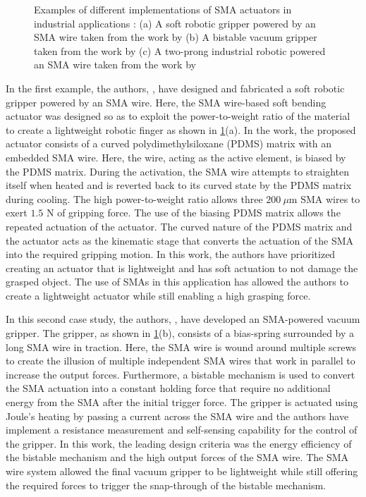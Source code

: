 \begin{figure}[h]
    \centering
    
    \caption{Examples of different implementations of SMA actuators in industrial applications : (a) A soft robotic gripper powered by an SMA wire taken from the work by \cite{rodrigueCurvedShapeMemory2017a} (b) A bistable vacuum gripper taken from the work by \cite{motzkiEnergyefficientSMAVacuum2016} (c) A two-prong industrial robotic powered an SMA wire taken from the work by \cite{luNovelDesignParallel2019}}
    \label{fig:industrial-examples}
\end{figure}

In the first example, the authors, \cite{rodrigueCurvedShapeMemory2017a}, have designed and fabricated a soft robotic gripper powered by an SMA wire. Here, the SMA wire-based soft bending actuator was designed so as to exploit the power-to-weight ratio of the material to create a lightweight robotic finger as shown in \cref{fig:industrial-examples}(a). In the work, the proposed actuator consists of a curved polydimethylsiloxane (PDMS) matrix with an embedded SMA wire. Here, the wire, acting as the active element, is biased by the PDMS matrix. During the activation, the SMA wire attempts to straighten itself when heated and is reverted back to its curved state by the PDMS matrix during cooling. The high power-to-weight ratio allows three $200~\mu$m SMA wires to exert $1.5$ N of gripping force. The use of the biasing PDMS matrix allows the repeated actuation of the actuator. The curved nature of the PDMS matrix and the actuator acts as the kinematic stage that converts the actuation of the SMA into the required gripping motion. In this work, the authors have prioritized creating an actuator that is lightweight and has soft actuation to not damage the grasped object. The use of SMAs in this application has allowed the authors to create a lightweight actuator while still enabling a high grasping force.

In this second case study, the authors, \cite{motzkiEnergyefficientSMAVacuum2016}, have developed an SMA-powered vacuum gripper. The gripper, as shown in \cref{fig:industrial-examples}(b), consists of a bias-spring surrounded by a long SMA wire in traction. Here, the SMA wire is wound around multiple screws to create the illusion of multiple independent SMA wires that work in parallel to increase the output forces. Furthermore, a bistable mechanism is used to convert the SMA actuation into a constant holding force that require no additional energy from the SMA after the initial trigger force. The gripper is actuated using Joule's heating by passing a current across the SMA wire and the authors have implement a resistance measurement and self-sensing capability for the control of the gripper. In this work, the leading design criteria was the energy efficiency of the bistable mechanism and the high output forces of the SMA wire. The SMA wire system allowed the final vacuum gripper to be lightweight while still offering the required forces to trigger the snap-through of the bistable mechanism.

